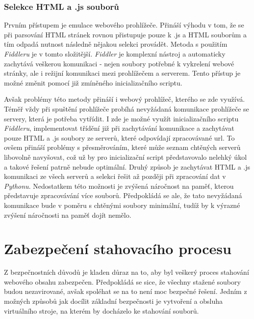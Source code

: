 \documentclass[thesis=M,czech,hidelinks]{FITthesis}[2013/05/06]
\begin{document}
\subsubsection{Selekce HTML a .js souborů}
Prvním přístupem je emulace webového prohlížeče. Přináší výhodu v tom, že se při parsování HTML stránek rovnou přistupuje pouze k .js a HTML souborům a tím odpadá nutnost následně nějakou selekci provádět. Metoda s použitím \textit{Fiddleru} je v tomto složitější. \textit{Fiddler} je komplexní nástroj a automaticky zachytává veškerou komunikaci - nejen soubory potřebné k vykrelení webové stránky, ale i režijní komunikaci mezi prohlížečem a serverem. Tento přístup je možné změnit pomocí již zmíněného inicializačního scriptu. 

Avšak problémy této metody přináší i webový prohlížeč, kterého se zde využívá. Téměř vždy při spuštění prohlížeče probíhá nevyžádaná komunikace prohlížeče se servery, která je potřeba vytřídit. I zde je možné využít inicializačního scriptu \textit{Fiddleru}, implementovat třídění již při zachytávání komunikace a zachytávat pouze HTML a .js soubory ze serverů, které odpovídají zpracovávané url. To ovšem přináší problémy s přesměrováním, které může seznam chtěných serverů libovolně navyšovat, což už by pro inicializační script představovalo nelehký úkol a takové řešení patrně nebude optimální. Druhý způsob je zachytávat HTML a .js komunikaci ze všech serverů a selekci řešit až později při zpracování dat v \textit{Pythonu}. Nedostatkem této možnosti je zvýšená náročnost na paměť, kterou představuje zpracovávání více souborů. Předpokládá se ale, že tato nevyžádaná komunikace bude v poměru s chtěnými soubory minimální, tudíž by k výrazné zvýšení náročnosti na paměť dojít nemělo.





\section{Zabezpečení stahovacího procesu}\label{sec:zabezpeceni}
Z bezpečnostních důvodů je kladen důraz na to, aby byl veškerý proces stahování webového obsahu zabezpečen. Předpokládá se sice, že všechny stažené soubory budou nezavirované, avšak spoléhat se na to není moc bezpečné řešení. Jedním z možných způsobů jak docílit základní bezpečnosti je vytvoření a obsluha virtuálního stroje, na kterém by docházelo ke stahování souborů. 
\end{document}
